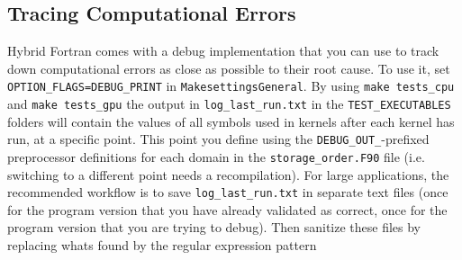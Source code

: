 \subsection{Tracing Computational Errors} \label{sub:debugTracing}
Hybrid Fortran comes with a debug implementation that you can use to track down computational errors as close as possible to their root cause. To use it, set \verb|OPTION_FLAGS=DEBUG_PRINT| in \verb|MakesettingsGeneral|. By using \verb|make tests_cpu| and \verb|make tests_gpu| the output in \verb|log_last_run.txt| in the \verb|TEST_EXECUTABLES| folders will contain the values of all symbols used in kernels after each kernel has run, at a specific point. This point you define using the \verb|DEBUG_OUT_|-prefixed preprocessor definitions for each domain in the \verb|storage_order.F90| file (i.e. switching to a different point needs a recompilation). For large applications, the recommended workflow is to save \verb|log_last_run.txt| in separate text files (once for the program version that you have already validated as correct, once for the program version that you are trying to debug). Then sanitize these files by replacing whats found by the regular expression pattern
